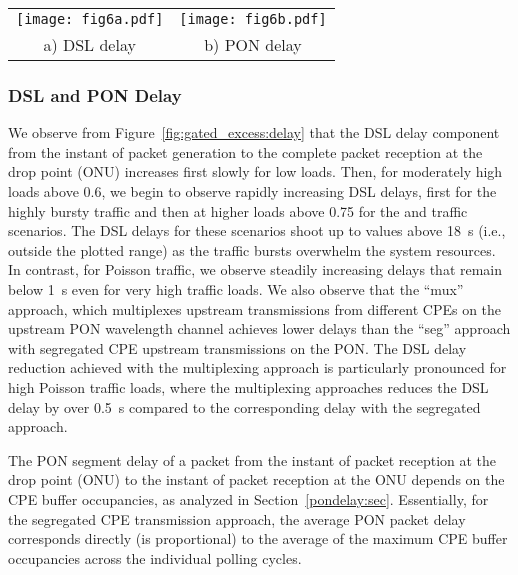 \documentclass[pdftex,journal]{IEEEtran}
\begin{document}
\begin{figure*}[t]
\centering
\begin{tabular}{cc}
\texttt{[image: fig6a.pdf]} &
\texttt{[image: fig6b.pdf]} \\
\footnotesize{a) DSL delay} &
\footnotesize{b) PON delay}
\end{tabular}
\caption{Average packet delays on DSL and PON segments for
GATED Flow Control approaches ONU:CPE:seg and ONU:CPE:mux with
(Online, Excess) DBA on PON for different level of
traffic burstiness (i.e., Hurst parameter ). }
\label{fig:gated_excess:delay}
\end{figure*}
\subsubsection{DSL and PON Delay}
We observe from Figure~\ref{fig:gated_excess:delay} that the DSL
delay component from the instant of packet generation to the
complete packet reception at the drop point (ONU) increases first
slowly for low loads. Then, for moderately high loads above 0.6, we
begin to observe rapidly increasing DSL delays, first for the highly
bursty  traffic and then at higher loads above 0.75 for
the  and  traffic scenarios. The DSL delays for
these  scenarios shoot up to values above 18~s (i.e.,
outside the plotted range) as the traffic bursts overwhelm the
system resources. In contrast, for Poisson traffic, we observe
steadily increasing delays that remain below 1~s even for very high
traffic loads. We also observe that the ``mux'' approach, which
multiplexes upstream transmissions from different CPEs on the
upstream PON wavelength channel achieves lower delays than the
``seg'' approach with segregated CPE upstream transmissions on the
PON. The DSL delay reduction achieved with the multiplexing approach
is particularly pronounced for high Poisson traffic loads, where
the multiplexing approaches reduces the DSL delay by over 0.5~s
compared to the corresponding delay with the segregated approach.

The PON segment delay of a packet from the instant of
packet reception at the drop point (ONU) to the instant
of packet reception at the ONU depends on the
CPE buffer occupancies, as analyzed in Section~\ref{pondelay:sec}.
Essentially, for the segregated CPE transmission approach,
the average PON packet delay corresponds directly
(is proportional) to the
average of the maximum CPE buffer occupancies 
across the individual polling cycles.
\end{document}
